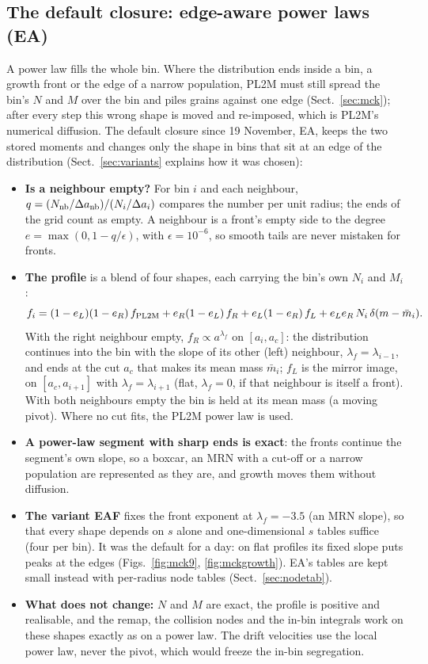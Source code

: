 \documentclass[11pt,a4paper]{article}
\begin{document}
\subsection{The default closure: edge-aware power laws (EA)}\label{sec:eaf}
A power law fills the whole bin. Where the distribution ends inside a bin, a growth front or the edge of a narrow
population, PL2M must still spread the bin's $N$ and $M$ over the bin and piles grains against one edge
(Sect.~\ref{sec:mck}); after every step this wrong shape is moved and re-imposed, which is PL2M's numerical diffusion.
The default closure since 19 November, EA, keeps the two stored moments and changes only the shape in bins that sit at
an edge of the distribution (Sect.~\ref{sec:variants} explains how it was chosen):
\begin{itemize}
\item \textbf{Is a neighbour empty?} For bin $i$ and each neighbour, $q = (N_{\rm nb}/\Delta a_{\rm nb})/(N_i/\Delta a_i)$
  compares the number per unit radius; the ends of the grid count as empty. A neighbour is a front's empty side to the
  degree $e = \max(0, 1 - q/\epsilon)$, with $\epsilon = 10^{-6}$, so smooth tails are never mistaken for fronts.
\item \textbf{The profile} is a blend of four shapes, each carrying the bin's own $N_i$ and $M_i$:
  \begin{equation}
  f_i = (1-e_L)(1-e_R)\,f_{\rm PL2M} + e_R(1-e_L)\,f_{R} + e_L(1-e_R)\,f_{L} + e_Le_R\,N_i\,\delta(m - \bar m_i).
  \end{equation}
  With the right neighbour empty, $f_R\propto a^{\lambda_f}$ on $[a_i, a_c]$: the distribution continues into the bin
  with the slope of its other (left) neighbour, $\lambda_f = \lambda_{i-1}$, and ends at the cut $a_c$ that makes its
  mean mass $\bar m_i$; $f_L$ is the mirror image, on $[a_c, a_{i+1}]$ with $\lambda_f = \lambda_{i+1}$ (flat,
  $\lambda_f = 0$, if that neighbour is itself a front). With both neighbours empty the bin is held at its mean mass
  (a moving pivot). Where no cut fits, the PL2M power law is used.
\item \textbf{A power-law segment with sharp ends is exact}: the fronts continue the segment's own slope, so a boxcar,
  an MRN with a cut-off or a narrow population are represented as they are, and growth moves them without diffusion.
\item \textbf{The variant EAF} fixes the front exponent at $\lambda_f = -3.5$ (an MRN slope), so that every shape
  depends on $s$ alone and one-dimensional $s$ tables suffice (four per bin). It was the default for a day: on flat
  profiles its fixed slope puts peaks at the edges (Figs.~\ref{fig:mck9}, \ref{fig:mckgrowth}). EA's tables are kept small
  instead with per-radius node tables (Sect.~\ref{sec:nodetab}).
\item \textbf{What does not change:} $N$ and $M$ are exact, the profile is positive and realisable, and the remap,
  the collision nodes and the in-bin integrals work on these shapes exactly as on a power law. The drift velocities use
  the local power law, never the pivot, which would freeze the in-bin segregation.
\end{itemize}
\end{document}

